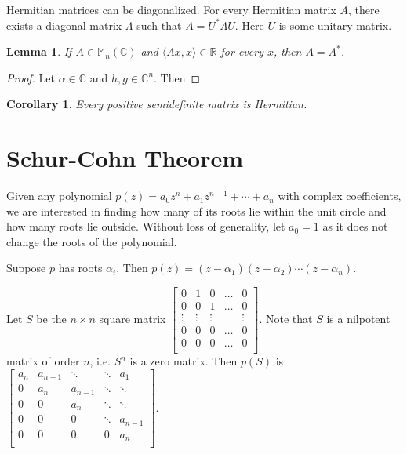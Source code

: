 \documentclass[twofold, twocolumn]{article}
\newcommand*\adj[1]{#1^*}
\theoremstyle{plain}
\newtheorem*{corollary}{Corollary}
\newtheorem*{lemma}{Lemma}
\theoremstyle{definition}
\begin{document}
Hermitian matrices can be diagonalized. For every Hermitian matrix \(A\), there exists a diagonal matrix \(\Lambda\) such that \(A = \adj{U}  \Lambda U\). Here \(U\) is some unitary matrix. 



\begin{lemma} If \(A \in \mathbb{M}_n (\mathbb{C})\) and \(\langle Ax, x \rangle \in \mathbb{R}\) for every \(x\), then \(A = \adj{A}\). \end{lemma}
\begin{proof} Let \(\alpha \in \mathbb{C}\) and \(h, g \in \mathbb{C}^n\). Then \end{proof}

\begin{corollary}Every positive semidefinite matrix is Hermitian.\end{corollary}
\section{Schur-Cohn Theorem}

Given any polynomial \(p(z) = a_0 z^n + a_1z^{n-1} + \cdots + a_n\) with complex coefficients, we are interested in finding how many of its roots lie within the unit circle and how many roots lie outside. Without loss of generality, let \(a_0 = 1\) as it does not change the roots of the polynomial. 

Suppose \(p\) has roots \(\alpha_i\). Then \(p(z) = (z - \alpha_1) (z - \alpha_2) \cdots (z - \alpha_n)\). 


Let \(S\) be the \(n \times n\) square matrix \( \begin{bmatrix} 
0 & 1 & 0 & \ldots & 0 \\
0 & 0 & 1 & \ldots & 0 \\
\vdots & \vdots & \vdots & & \vdots \\
0 & 0 & 0 &\ldots & 0 \\
0 & 0 & 0 & \ldots & 0 \\ 
\end{bmatrix}\).  Note that \(S\) is a nilpotent matrix of order \(n\), i.e. \(S^n\) is a zero matrix. Then \(p(S) \) is \( \begin{bmatrix} 
a_n & a_{n-1} & \ddots & \ddots & a_1 \\
0 & a_n & a_{n-1} & \ddots & \ddots \\
0 & 0 & a_n & \ddots & \ddots \\
0 & 0 & 0 &\ddots & a_{n-1} \\
0 & 0 & 0 & 0 & a_n \\ 
\end{bmatrix}\). 
\end{document}
